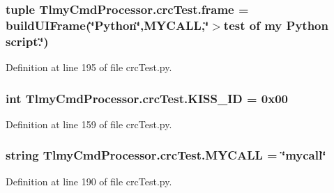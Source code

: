 \subsubsection[{frame}]{\setlength{\rightskip}{0pt plus 5cm}tuple Tlmy\+Cmd\+Processor.\+crc\+Test.\+frame = {\bf build\+U\+I\+Frame}(\char`\"{}Python\char`\"{},M\+Y\+C\+A\+L\+L,\char`\"{}$>$test of my Python script.\char`\"{})}\label{namespace_tlmy_cmd_processor_1_1crc_test_a28e7bdc26cab757551ee8a5c58656a0b}


Definition at line 195 of file crc\+Test.\+py.

\hypertarget{namespace_tlmy_cmd_processor_1_1crc_test_a570cd914a6c92d3588704c88602d5ddc}{}
\subsubsection[{K\+I\+S\+S\+\_\+\+I\+D}]{\setlength{\rightskip}{0pt plus 5cm}int Tlmy\+Cmd\+Processor.\+crc\+Test.\+K\+I\+S\+S\+\_\+\+I\+D = 0x00}\label{namespace_tlmy_cmd_processor_1_1crc_test_a570cd914a6c92d3588704c88602d5ddc}


Definition at line 159 of file crc\+Test.\+py.

\hypertarget{namespace_tlmy_cmd_processor_1_1crc_test_ae763384037b73e8a02ac30a08c0f6239}{}
\subsubsection[{M\+Y\+C\+A\+L\+L}]{\setlength{\rightskip}{0pt plus 5cm}string Tlmy\+Cmd\+Processor.\+crc\+Test.\+M\+Y\+C\+A\+L\+L = \char`\"{}mycall\char`\"{}}\label{namespace_tlmy_cmd_processor_1_1crc_test_ae763384037b73e8a02ac30a08c0f6239}


Definition at line 190 of file crc\+Test.\+py.

\hypertarget{namespace_tlmy_cmd_processor_1_1crc_test_a0c53a9252c9f79e6e39eb47f43f9b79a}{}
